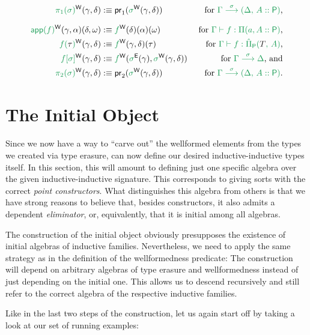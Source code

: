 \begin{defn}
\begin{defn}
\begin{align*}
\grm{\pi_1(\sigma)}^\WW(\gamma, \delta)
  &:\equiv \pr_1(\grm{\sigma}^\WW(\gamma, \delta))
  & \text{ for \grm{\IISub{\sigma}{\Gamma}{(\Delta,\,A :: \Pc)}},} \\[.7em]
\grm{\IIapp(f)}^\WW(\gamma, \alpha)(\delta, \omega)
  &:\equiv \grm{f}^\WW(\delta)(\alpha)(\omega)
  & \text{ for \grm{\Gamma \vdash f : \Pi(a, A :: \Pc)},} \\
\grm{f(\bltau)}^\WW(\gamma, \delta)
  &:\equiv \grm{f}^\WW(\gamma, \delta)(\tau)
  & \text{ for \grm{\Gamma \vdash f : \ExtPiP{T}{A}},} \\
\grm{f[\sigma]}^\WW(\gamma, \delta)
  &:\equiv \grm{f}^\WW(\grm{\sigma}^\EE(\gamma), \grm{\sigma}^\WW(\gamma, \delta))
  & \text{ for \grm{\IISub{\sigma}{\Gamma}{\Delta}}, and} \\
\grm{\pi_2(\sigma)}^\WW(\gamma, \delta)
  &:\equiv \pr_2(\grm{\sigma}^\WW(\gamma, \delta))
  & \text{ for \grm{\IISub{\sigma}{\Gamma}{(\Delta,\,A :: \Pc)}}.}
\end{align*}
\end{defn}

\section{The Initial Object}\label{sec:red-sg}

Since we now have a way to ``carve out'' the wellformed elements from the types
we created via type erasure, can now define our desired inductive-inductive types
itself.
In this section, this will amount to defining just one specific algebra over the
given inductive-inductive signature.
This corresponds to giving sorts with the correct \emph{point constructors}.
What distinguishes this algebra from others is that we have strong reasons to believe
that, besides constructors, it also admits a dependent
\emph{eliminator}, or, equivalently, that it is initial among all algebras.

The construction of the initial object obviously presupposes the existence of
initial algebras of inductive families.
Nevertheless, we need to apply the same strategy as in the definition of the
wellformedness predicate:
The construction will depend on arbitrary algebras of type erasure and wellformedness
instead of just depending on the initial one.
This allows us to descend recursively and still refer to the correct algebra
of the respective inductive families.

Like in the last two steps of the construction, let us again start off by taking
a look at our set of running examples:


\end{defn}
